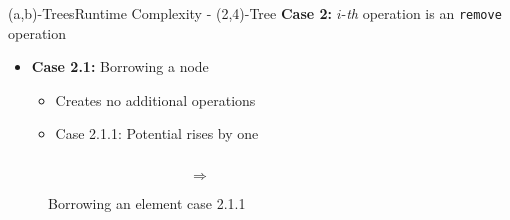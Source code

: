 \begin{frame}{(a,b)-Trees}{Runtime Complexity - (2,4)-Tree}
  \textbf{Case 2:}
  {\color{Mittel-Blau}$i$}-\textit{th} operation is an
  \texttt{\color{Mittel-Blau}remove} operation
  \begin{itemize}
    \item
      \textbf{Case 2.1:} Borrowing a node
      \begin{itemize}
        \item
          Creates no additional operations
        \item
          Case 2.1.1: Potential rises by one
      \end{itemize}
  \end{itemize}
  \begin{figure}
    \begin{columns}
      \begin{column}{0.35\linewidth}
        \begin{adjustbox}{width=\linewidth}
          
        \end{adjustbox}
      \end{column}
      \begin{column}{0.1\linewidth}
        \begin{center}
          $\Rightarrow$
        \end{center}
      \end{column}
      \begin{column}{0.35\linewidth}
        \begin{adjustbox}{width=\linewidth}
          
        \end{adjustbox}
      \end{column}
    \end{columns}
    \caption{Borrowing an element case 2.1.1}
    \label{fig:a_b_tree:move_potential_1}
  \end{figure}
\end{frame}


